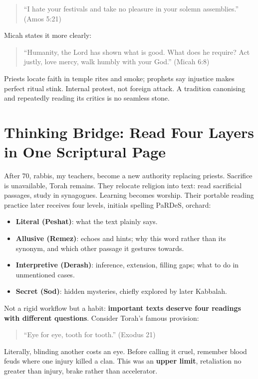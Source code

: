 \begin{quote}
``I hate your festivals and take no pleasure in your solemn assemblies.'' (Amos 5:21)
\end{quote}
Micah states it more clearly:

\begin{quote}
``Humanity, the Lord has shown what is good. What does he require? Act justly, love mercy, walk humbly with your God.'' (Micah 6:8)
\end{quote}
Priests locate faith in temple rites and smoke; prophets say injustice makes perfect ritual stink. Internal protest, not foreign attack. A tradition canonising and repeatedly reading its critics is no seamless stone.

\section[Thinking Bridge: Four Layers of Reading]{Thinking Bridge: Read Four Layers in One Scriptural Page}
After 70, rabbis, my teachers, become a new authority replacing priests. Sacrifice is unavailable, Torah remains. They relocate religion into text: read sacrificial passages, study in synagogues. Learning becomes worship. Their portable reading practice later receives four levels, initials spelling PaRDeS, orchard:

\begin{itemize}
\item \textbf{Literal (Peshat)}: what the text plainly says.
\item \textbf{Allusive (Remez)}: echoes and hints; why this word rather than its synonym, and which other passage it gestures towards.
\item \textbf{Interpretive (Derash)}: inference, extension, filling gaps; what to do in unmentioned cases.
\item \textbf{Secret (Sod)}: hidden mysteries, chiefly explored by later Kabbalah.
\end{itemize}
Not a rigid workflow but a habit: \textbf{important texts deserve four readings with different questions}. Consider Torah's famous provision:

\begin{quote}
``Eye for eye, tooth for tooth.'' (Exodus 21)
\end{quote}
Literally, blinding another costs an eye. Before calling it cruel, remember blood feuds where one injury killed a clan. This was an \textbf{upper limit}, retaliation no greater than injury, brake rather than accelerator.

